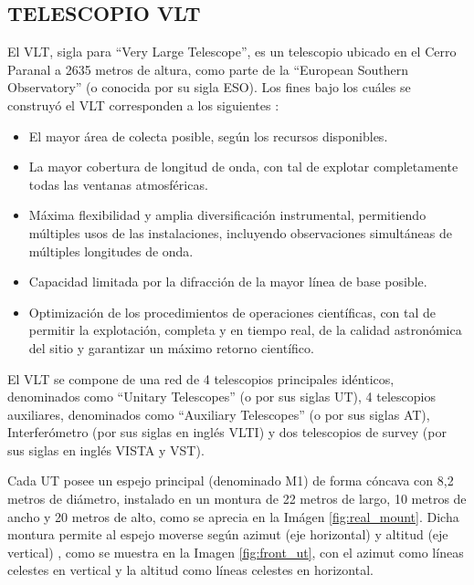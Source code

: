 
\subsection{TELESCOPIO VLT}
El VLT, sigla para “Very Large Telescope”, es un telescopio ubicado en el Cerro Paranal a 2635 metros de altura, como parte de la “European Southern Observatory” (o conocida por su sigla ESO). 
Los fines bajo los cuáles se construyó el VLT corresponden a los siguientes \cite{eso1998vlt}:
\begin{itemize}

    \item El mayor área de colecta posible, según los recursos disponibles.
    \item La mayor cobertura de longitud de onda, con tal de explotar completamente todas las ventanas atmosféricas.
    \item Máxima flexibilidad y amplia diversificación instrumental, permitiendo múltiples usos de las instalaciones, incluyendo observaciones simultáneas de múltiples longitudes de onda.
    \item Capacidad limitada por la difracción de la mayor línea de base posible.
    \item Optimización de los procedimientos de operaciones científicas, con tal de permitir la explotación, completa y en tiempo real, de la calidad astronómica del sitio y garantizar un máximo retorno científico.

\end{itemize}

El VLT se compone de una red de 4 telescopios principales idénticos, denominados como “Unitary Telescopes” (o por sus siglas UT), 4 telescopios auxiliares, denominados como “Auxiliary Telescopes” (o por sus siglas AT), Interferómetro (por sus siglas en inglés VLTI) y dos telescopios de survey (por sus siglas en inglés VISTA y VST).

Cada UT posee un espejo principal (denominado M1) de forma cóncava con 8,2 metros de diámetro, instalado en un montura de 22 metros de largo, 10 metros de ancho y 20 metros de alto, como se aprecia en la Imágen \ref{fig:real_mount}. Dicha montura permite al espejo moverse según azimut (eje horizontal) y altitud (eje vertical) \cite{eso1998vlt}, como se muestra en la Imagen \ref{fig:front_ut}, con el azimut como líneas celestes en vertical y la altitud como líneas celestes en horizontal.

